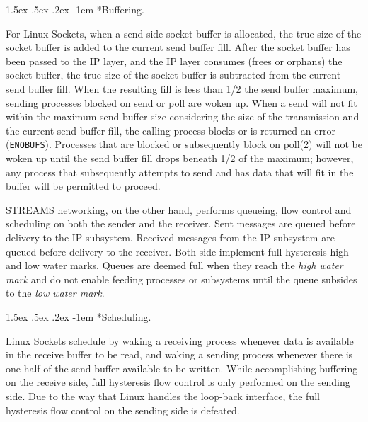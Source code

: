 \documentclass[letterpaper,final,notitlepage,twocolumn,10pt,twoside]{article}
\makeatletter
\renewcommand\paragraph{\@startsection{paragraph}{4}{\z@}%
                                    {1.5ex \@plus .5ex \@minus .2ex}%
                                    {-1em}%
                                    {\normalfont\normalsize\bfseries\slshape}}
\makeatother
\begin{document}
\paragraph*{Buffering.}

For Linux Sockets, when a send side socket buffer is allocated, the true size of the socket buffer
is added to the current send buffer fill.  After the socket buffer has been passed to the IP layer,
and the IP layer consumes (frees or orphans) the socket buffer, the true size of the socket buffer
is subtracted from the current send buffer fill.  When the resulting fill is less than 1/2 the send
buffer maximum, sending processes blocked on send or poll are woken up.  When a send will not fit
within the maximum send buffer size considering the size of the transmission and the current send
buffer fill, the calling process blocks or is returned an error (\texttt{ENOBUFS}).  Processes that
are blocked or subsequently block on poll(2) will not be woken up until the send buffer fill drops
beneath 1/2 of the maximum; however, any process that subsequently attempts to send and has data
that will fit in the buffer will be permitted to proceed.

STREAMS networking, on the other hand, performs queueing, flow control and scheduling on both the
sender and the receiver.  Sent messages are queued before delivery to the IP subsystem.  Received
messages from the IP subsystem are queued before delivery to the receiver.  Both side implement full
hysteresis high and low water marks.  Queues are deemed full when they reach the \textit{high water
mark} and do not enable feeding processes or subsystems until the queue subsides to the \textit{low
water mark}.

\paragraph*{Scheduling.}

Linux Sockets schedule by waking a receiving process whenever data is available in the receive
buffer to be read, and waking a sending process whenever there is one-half of the send buffer
available to be written.  While accomplishing buffering on the receive side, full hysteresis flow
control is only performed on the sending side.  Due to the way that Linux handles the loop-back
interface, the full hysteresis flow control on the sending side is defeated.
\end{document}

